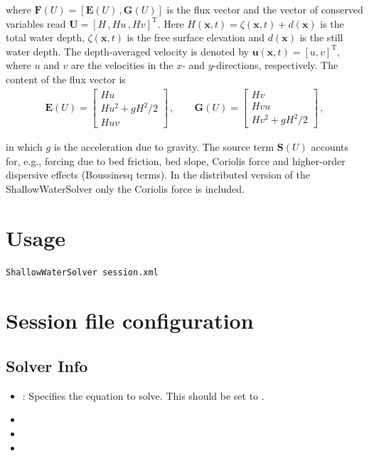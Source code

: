 where $\mathbf F(U) = \left[{\mathbf E(U)}\,, {\mathbf G(U)} \right]$ is the
flux vector and the vector of conserved variables read
${\mathbf U}=\left[H\,,Hu\,,Hv \right]^\mathrm{T}$. Here 
$H({\mathbf x},t)=\zeta({\mathbf x},t) + d({\mathbf x})$ is the total
water depth, $\zeta({\mathbf x},t)$ is the free surface elevation and
$d({\mathbf x})$ is the still water depth. The depth-averaged velocity
is denoted by ${\mathbf u}({\mathbf x},t) = \left[u,v\right]^\mathrm{T}$,
where $u$ and $v$ are the velocities in the $x$- and
$y$-directions, respectively. The content of the flux vector is
\begin{align*}
{\mathbf E(U)} = \left[ \begin{array}{c} Hu\\Hu^2 +
gH^2/2\\Huv\end{array}\right]\,, \qquad {\mathbf G(U)} = \left[
\begin{array}{c} Hv\\Hvu\\Hv^2 + gH^2/2\end{array}\right]\,,
\end{align*}

in which $g$ is the acceleration due to gravity. The source term
${\mathbf S(U)}$ accounts for, e.g., forcing due to bed
friction, bed slope, Coriolis force and higher-order dispersive effects 
(Boussinesq terms). In the distributed version of the ShallowWaterSolver
only the Coriolis force is included. 

\section{Usage}
\begin{lstlisting}[style=BashInputStyle]
ShallowWaterSolver session.xml
\end{lstlisting}

\section{Session file configuration}

\subsection{Solver Info}
\begin{itemize}
\item {}: Specifies the equation to solve. This should be set
to .
\item {}
\item {}
\item {}
\end{itemize}

